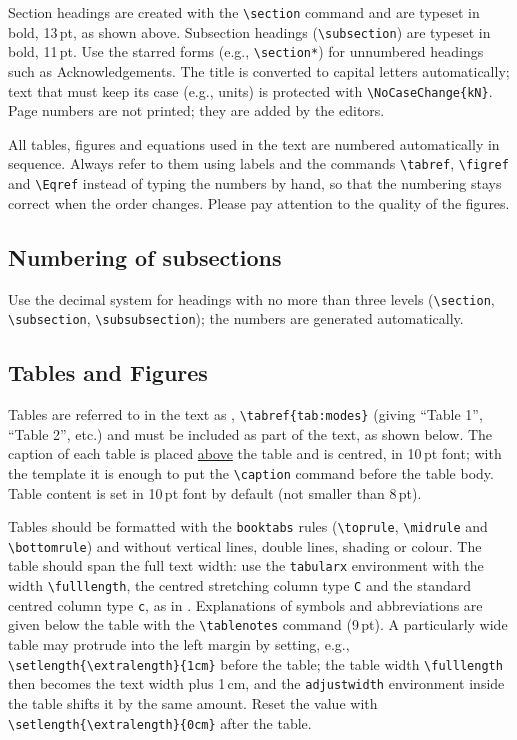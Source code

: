 \documentclass{Definitions/CroCEE}
\begin{document}
Section headings are created with the \texttt{\textbackslash section} command and are typeset in bold, 13\,pt, as shown above. Subsection headings (\texttt{\textbackslash subsection}) are typeset in bold, 11\,pt. Use the starred forms (e.g., \texttt{\textbackslash section*}) for unnumbered headings such as Acknowledgements. The title is converted to capital letters automatically; text that must keep its case (e.g., units) is protected with \texttt{\textbackslash NoCaseChange\{kN\}}. Page numbers are not printed; they are added by the editors.

All tables, figures and equations used in the text are numbered automatically in sequence. Always refer to them using labels and the commands \texttt{\textbackslash tabref}, \texttt{\textbackslash figref} and \texttt{\textbackslash Eqref} instead of typing the numbers by hand, so that the numbering stays correct when the order changes. Please pay attention to the quality of the figures.

\subsection{Numbering of subsections}

Use the decimal system for headings with no more than three levels (\texttt{\textbackslash section}, \texttt{\textbackslash subsection}, \texttt{\textbackslash subsubsection}); the numbers are generated automatically.

\subsection{Tables and Figures}

Tables are referred to in the text as , \texttt{\textbackslash tabref\{tab:modes\}} (giving ``Table 1'', ``Table 2'', etc.) and must be included as part of the text, as shown below. The caption of each table is placed \underline{above} the table and is centred, in 10\,pt font; with the template it is enough to put the \texttt{\textbackslash caption} command before the table body. Table content is set in 10\,pt font by default (not smaller than 8\,pt).

Tables should be formatted with the \texttt{booktabs} rules (\texttt{\textbackslash toprule}, \texttt{\textbackslash midrule} and \texttt{\textbackslash bottomrule}) and without vertical lines, double lines, shading or colour. The table should span the full text width: use the \texttt{tabularx} environment with the width \texttt{\textbackslash fulllength}, the centred stretching column type \texttt{C} and the standard centred column type \texttt{c}, as in . Explanations of symbols and abbreviations are given below the table with the \texttt{\textbackslash tablenotes} command (9\,pt). A particularly wide table may protrude into the left margin by setting, e.g., \texttt{\textbackslash setlength\{\textbackslash extralength\}\{1cm\}} before the table; the table width \texttt{\textbackslash fulllength} then becomes the text width plus 1\,cm, and the \texttt{adjustwidth} environment inside the table shifts it by the same amount. Reset the value with \texttt{\textbackslash setlength\{\textbackslash extralength\}\{0cm\}} after the table.
\end{document}
